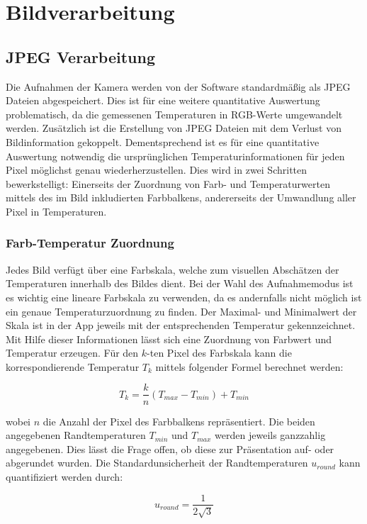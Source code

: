 \documentclass[10pt,a4paper,german]{article}
\begin{document}
\section{Bildverarbeitung}
\subsection{JPEG Verarbeitung}
Die Aufnahmen der Kamera werden von der Software standardmäßig als JPEG Dateien abgespeichert.
Dies ist für eine weitere quantitative Auswertung problematisch, da die gemessenen Temperaturen in RGB-Werte umgewandelt werden.
Zusätzlich ist die Erstellung von JPEG Dateien mit dem Verlust von Bildinformation gekoppelt. 
Dementsprechend ist es für eine quantitative Auswertung notwendig die ursprünglichen Temperaturinformationen für jeden Pixel möglichst genau wiederherzustellen.
Dies wird in zwei Schritten bewerkstelligt:
Einerseits der Zuordnung von Farb- und Temperaturwerten mittels des im Bild inkludierten Farbbalkens, andererseits der Umwandlung aller Pixel in Temperaturen.

\subsubsection{Farb-Temperatur Zuordnung}

Jedes Bild verfügt über eine Farbskala, welche zum visuellen Abschätzen der Temperaturen innerhalb des Bildes dient.
Bei der Wahl des Aufnahmemodus ist es wichtig eine lineare Farbskala zu verwenden, da es andernfalls nicht möglich ist ein genaue Temperaturzuordnung zu finden.
Der Maximal- und Minimalwert der Skala ist in der App jeweils mit der entsprechenden Temperatur gekennzeichnet.
Mit Hilfe dieser Informationen lässt sich eine Zuordnung von Farbwert und Temperatur erzeugen.
Für den $k$-ten Pixel des Farbskala kann die korrespondierende Temperatur $T_{k}$ mittels folgender Formel berechnet werden:

\begin{equation}
    T_{k} = \frac{k}{n} \left(T_{max} - T_{min}\right) + T_{min}
\end{equation}

wobei $n$ die Anzahl der Pixel des Farbbalkens repräsentiert.
Die beiden angegebenen Randtemperaturen $T_{min}$ und $T_{max}$ werden jeweils ganzzahlig angegebenen.
Dies lässt die Frage offen, ob diese zur Präsentation auf- oder abgerundet wurden.
Die Standardunsicherheit der Randtemperaturen $u_{round}$ kann quantifiziert werden durch:

\begin{equation}
    u_{round} = \frac{1}{2\sqrt{3}}
\end{equation}
\end{document}
